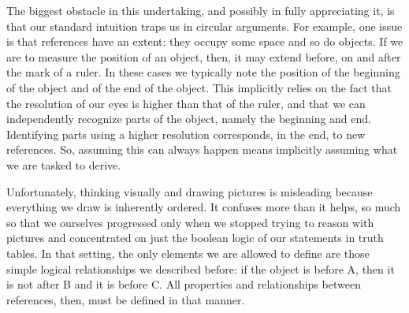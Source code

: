 \documentclass[12pt]{iopart}
\begin{document}
The biggest obstacle in this undertaking, and possibly in fully appreciating it, is that our standard intuition traps us in circular arguments. For example, one issue is that references have an extent: they occupy some space and so do objects. If we are to measure the position of an object, then, it may extend before, on and after the mark of a ruler. In these cases we typically note the position of the beginning of the object and of the end of the object. This implicitly relies on the fact that the resolution of our eyes is higher than that of the ruler, and that we can independently recognize parts of the object, namely the beginning and end. Identifying parts using a higher resolution corresponds, in the end, to new references. So, assuming this can always happen means implicitly assuming what we are tasked to derive.

Unfortunately, thinking visually and drawing pictures is misleading because everything we draw is inherently ordered. It confuses more than it helps, so much so that we ourselves progressed only when we stopped trying to reason with pictures and concentrated on just the boolean logic of our statements in truth tables. In that setting, the only elements we are allowed to define are those simple logical relationships we described before: if the object is before A, then it is not after B and it is before C. All properties and relationships between references, then, must be defined in that manner.
\end{document}
